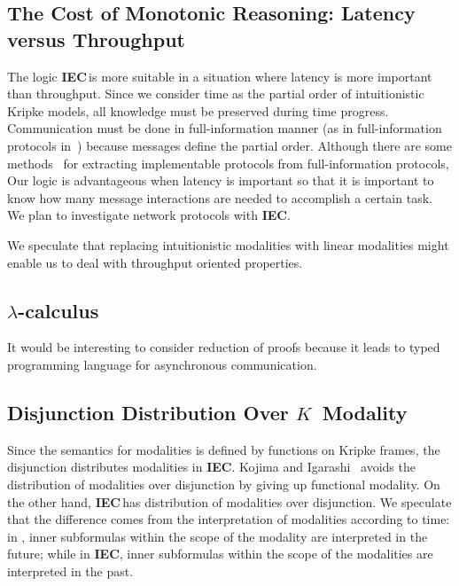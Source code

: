 \documentclass[doctor]{iscs-thesis}
\newcommand{\iec}{{\rm {\textbf{IEC}}}}
\begin{document}
\subsection{The Cost of Monotonic Reasoning: Latency versus Throughput}

The logic \iec\,is more suitable in a situation where latency is more important than throughput.
Since we consider time as the partial order of intuitionistic Kripke models,
all knowledge must be preserved during time progress.
Communication must be done in full-information manner (as in
full-information protocols in~\cite{182113}) because messages
define the partial order.
 Although there are some methods~\cite{182113, halpern1990knowledge, halpern1987using,
 halpern1985formal}
  for extracting implementable protocols from
 full-information protocols, 
Our logic is advantageous when latency is important so that
it is important to know how many message interactions are needed to accomplish a certain
task.  We plan to investigate network protocols with \iec.

We speculate that replacing intuitionistic modalities with
linear modalities might enable us to deal with throughput oriented properties.

\subsection{$\lambda$-calculus} 

It would be interesting to consider reduction of proofs
because it leads to typed programming language for asynchronous communication.

\subsection{Disjunction Distribution Over $K$~Modality}

Since the semantics for modalities is defined by functions on Kripke frames,
the disjunction distributes modalities in \iec.
Kojima and Igarashi~\cite{kojima2008constructive} avoids the distribution of modalities 
over disjunction by giving up functional modality.
On the other hand, \iec\,has distribution of modalities over disjunction.
We speculate that the difference comes from the interpretation of modalities according to
time:
in \cite{kojima2008constructive}, 
inner subformulas within the scope of the modality are interpreted in the future; while
in \iec, inner subformulas within the scope of the modalities are interpreted in the past.
\end{document}
